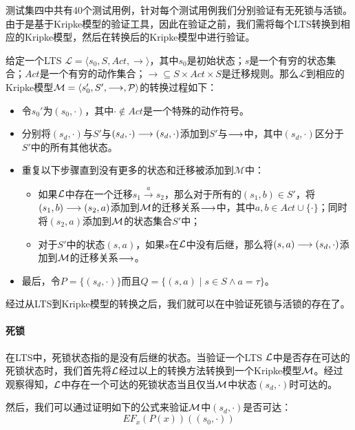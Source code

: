 测试集四中共有40个测试用例，针对每个测试用例我们分别验证有无死锁与活锁。由于\sctlprov{}是基于Kripke模型的验证工具，因此在验证之前，我们需将每个\textsf{LTS}转换到相应的Kripke模型，然后在转换后的Kripke模型中进行验证。


给定一个\textsf{LTS} $\mathcal{L} = \langle s_0, S, Act, \rightarrow \rangle$，其中$s_0$是初始状态；$s$是一个有穷的状态集合；$Act$是一个有穷的动作集合；$\rightarrow \subseteq S\times Act\times S$是迁移规则。那么$\mathcal{L}$到相应的Kripke模型$\mathcal{M} = \langle s_0', S', \longrightarrow, {\mathcal P} \rangle$的转换过程如下：

\begin{itemize}
	\item 令$s_0'$为$(s_0, \cdot)$，其中$\cdot\notin Act$是一个特殊的动作符号。
	\item 分别将$(s_d,\cdot)$与$S'$与$(s_d,\cdot)\longrightarrow (s_d,\cdot)$添加到$S'$与$\longrightarrow$中，其中$(s_d,\cdot)$区分于$S'$中的所有其他状态。
	\item 重复以下步骤直到没有更多的状态和迁移被添加到$\mathcal{M}$中：
	\begin{itemize}
		\item 如果$\cal L$中存在一个迁移$s_1\stackrel{a}\rightarrow s_2$，那么对于所有的$(s_1, b)\in S'$，将$(s_1, b)\longrightarrow (s_2, a)$添加到$\cal M$的迁移关系$\longrightarrow$中，其中$a, b\in Act\cup\{\cdot\}$；同时将$(s_2, a)$添加到$\cal M$的状态集合$S'$中；
		\item 对于$S'$中的状态$(s,a)$，如果$s$在$\cal L$中没有后继，那么将$(s,a)\longrightarrow (s_d,\cdot)$添加到$\cal M$的迁移关系$\longrightarrow$。
	\end{itemize}
	\item 最后，令$P=\{(s_d,\cdot)\}$而且$Q = \{(s,a)\mid s\in S\wedge a=\tau\}$。
\end{itemize}
经过从\textsf{LTS}到Kripke模型的转换之后，我们就可以在\sctlprov{}中验证死锁与活锁的存在了。

\paragraph{死锁}
在\textsf{LTS}中，死锁状态指的是没有后继的状态。当验证一个\textsf{LTS} $\cal L$中是否存在可达的死锁状态时，我们首先将$\cal L$经过以上的转换方法转换到一个Kripke模型$\cal M$。经过观察得知，$\cal L$中存在一个可达的死锁状态当且仅当$\cal M$中状态$(s_d,\cdot)$时可达的。

然后，我们可以通过证明如下的公式来验证$\cal M$中$(s_d,\cdot)$是否可达：
$$EF_x(P(x))((s_0,\cdot))$$ 

